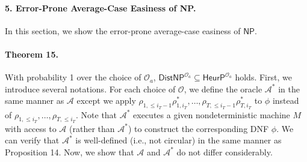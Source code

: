 \paragraph{5. Error-Prone Average-Case Easiness of NP.}
In this section, we show the error-prone average-case easiness of $\mathsf{NP}$.
\paragraph{Theorem 15.}
With probability 1 over the choice of $\mathcal O_a$, $\mathsf{DistNP}^{\mathcal O_a}\subseteq\mathsf{HeurP}^{\mathcal O_a}$ holds.
First, we introduce several notations. For each choice of $\mathcal O$, we define the oracle $\mathcal A^*$ in the same manner as $\mathcal A$ except we apply $\rho_{1,\leq i_T-1}\rho^*_{1,i_T},\ldots,\rho_{T,\leq i_T-1}\rho^*_{T,i_T}$ to $\phi$ instead of $\rho_{1,\leq i_T},\ldots,\rho_{T,\leq i_T}$. Note that $\mathcal A^*$ executes a given nondeterministic machine $M$ with access to $\mathcal A$ (rather than $\mathcal A^*$) to construct the corresponding DNF $\phi$. We can verify that $\mathcal A^*$ is well-defined (i.e., not circular) in the same manner as Proposition 14.
Now, we show that $\mathcal A$ and $\mathcal A^*$ do not differ considerably.
